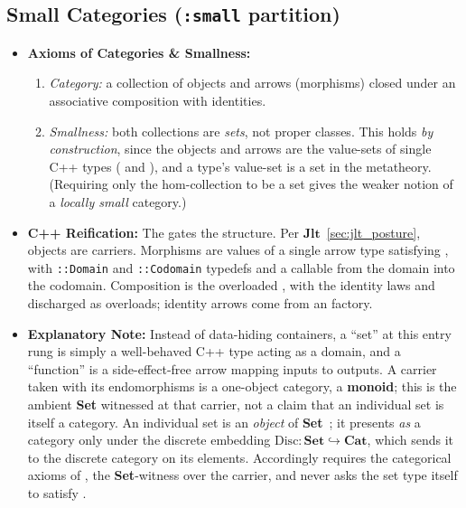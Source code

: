\documentclass[11pt, a4paper]{article}
\begin{document}
\subsection{Small Categories (\texttt{:small} partition)}
\begin{itemize}
    \item \textbf{Axioms of Categories \& Smallness:}
    \begin{enumerate}
        \item \textit{Category:} a collection of objects and arrows (morphisms) closed under an associative composition with identities.
        \item \textit{Smallness:} both collections are \emph{sets}, not proper classes. This holds \emph{by construction}, since the objects and arrows are the value-sets of single C++ types ( and ), and a type's value-set is a set in the metatheory. (Requiring only the hom-collection to be a set gives the weaker notion of a \emph{locally small} category.)
    \end{enumerate}
    \item \textbf{C++ Reification:} The  gates the structure. Per $\mathbf{Jlt}$~\ref{sec:jlt_posture}, objects are  carriers. Morphisms are values of a single arrow type satisfying , with \texttt{::Domain} and \texttt{::Codomain} typedefs and a callable  from the domain into the codomain. Composition is the overloaded , with the identity laws  and  discharged as overloads; identity arrows come from an  factory.
    \item \textbf{Explanatory Note:} Instead of data-hiding containers, a ``set'' at this entry rung is simply a well-behaved C++ type acting as a domain, and a ``function'' is a side-effect-free arrow mapping inputs to outputs. A carrier taken with its endomorphisms is a one-object category, a \textbf{monoid}; this is the ambient \textbf{Set} witnessed at that carrier, not a claim that an individual set is itself a category. An individual set is an \emph{object} of \textbf{Set}~\cite{lawvere1964etcs}; it presents \emph{as} a category only under the discrete embedding $\mathrm{Disc}\colon\textbf{Set}\hookrightarrow\textbf{Cat}$, which sends it to the discrete category on its elements. Accordingly  requires the categorical axioms of , the \textbf{Set}-witness over the carrier, and never asks the set type itself to satisfy .
\end{itemize}
\end{document}
